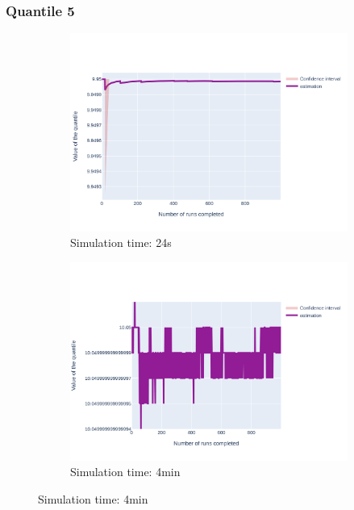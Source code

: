 \documentclass{article}
\begin{document}
\subsubsection{Quantile 5}
\begin{figure}[H]
    \centering
    \begin{subfigure}{.495\textwidth}
        \centering
        \includegraphics[width=\textwidth]{../fig/quantile5/VD2_24s.png}
        \caption{Simulation time: 24s}
        \vspace{.5cm}
    \end{subfigure}
    \begin{subfigure}{.495\textwidth}
        \centering
        \includegraphics[width=\textwidth]{../fig/quantile5/VD2_4mn.png}
        \caption{Simulation time: 4min}
        \vspace{.5cm}

\end{subfigure}
\end{figure}
\end{document}
